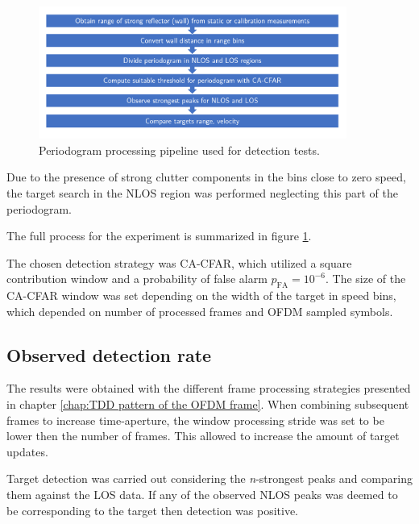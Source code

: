 \begin{figure}[H]
	\centering
	\includegraphics[width=0.9\textwidth]{Images/Test1/NLOS-proc-pipeline.png}
	\caption{Periodogram processing pipeline used for detection tests.}
	\label{fig:Test1_NLOS-proc-pipeline}
\end{figure}


Due to the presence of strong clutter components in the bins close to zero speed, the target search in the NLOS region was performed neglecting this part of the periodogram.

The full process for the experiment is summarized in figure \ref{fig:Test1_NLOS-proc-pipeline}.

The chosen detection strategy was CA-CFAR, which utilized a square contribution window and a probability of false alarm $p_{\text{FA}} = 10^{-6}$. The size of the CA-CFAR window was set depending on the width of the target in speed bins, which depended on number of processed frames and OFDM sampled symbols.

\subsection{Observed detection rate}

The results were obtained with the different frame processing strategies presented in chapter \ref{chap:TDD pattern of the OFDM frame}. When combining subsequent frames to increase time-aperture, the window processing stride was set to be lower then the number of frames. This allowed to increase the amount of target updates.

Target detection was carried out considering the \textit{n}-strongest peaks and comparing them against the LOS data. If any of the observed NLOS peaks was deemed to be corresponding to the target then detection was positive.

